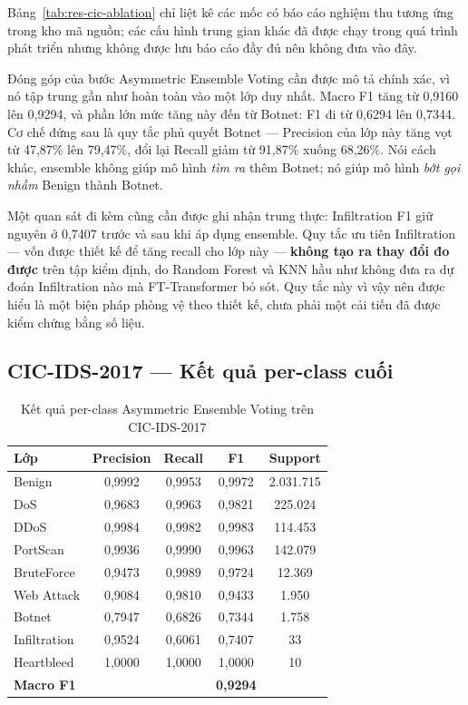 \documentclass[../DoAn.tex]{subfiles}
\begin{document}
Bảng~\ref{tab:res-cic-ablation} chỉ liệt kê các mốc có báo cáo nghiệm thu tương ứng trong kho mã nguồn; các cấu hình trung gian khác đã được chạy trong quá trình phát triển nhưng không được lưu báo cáo đầy đủ nên không đưa vào đây.

Đóng góp của bước Asymmetric Ensemble Voting cần được mô tả chính xác, vì nó tập trung gần như hoàn toàn vào một lớp duy nhất. Macro F1 tăng từ 0,9160 lên 0,9294, và phần lớn mức tăng này đến từ Botnet: F1 đi từ 0,6294 lên 0,7344. Cơ chế đứng sau là quy tắc phủ quyết Botnet --- Precision của lớp này tăng vọt từ 47,87\% lên 79,47\%, đổi lại Recall giảm từ 91,87\% xuống 68,26\%. Nói cách khác, ensemble không giúp mô hình \textit{tìm ra} thêm Botnet; nó giúp mô hình \textit{bớt gọi nhầm} Benign thành Botnet.

Một quan sát đi kèm cũng cần được ghi nhận trung thực: Infiltration F1 giữ nguyên ở 0,7407 trước và sau khi áp dụng ensemble. Quy tắc ưu tiên Infiltration --- vốn được thiết kế để tăng recall cho lớp này --- \textbf{không tạo ra thay đổi đo được} trên tập kiểm định, do Random Forest và KNN hầu như không đưa ra dự đoán Infiltration nào mà FT-Transformer bỏ sót. Quy tắc này vì vậy nên được hiểu là một biện pháp phòng vệ theo thiết kế, chưa phải một cải tiến đã được kiểm chứng bằng số liệu.

\subsection{CIC-IDS-2017 --- Kết quả per-class cuối}

\begin{table}[H]
    \centering
    \caption{Kết quả per-class Asymmetric Ensemble Voting trên CIC-IDS-2017}
    \label{tab:res-cic-final}
    \begin{tabular}{lcccc}
        \hline
        \textbf{Lớp} & \textbf{Precision} & \textbf{Recall} & \textbf{F1} & \textbf{Support} \\
        \hline
        Benign      & 0,9992 & 0,9953 & 0,9972 & 2.031.715 \\
        DoS         & 0,9683 & 0,9963 & 0,9821 & 225.024 \\
        DDoS        & 0,9984 & 0,9982 & 0,9983 & 114.453 \\
        PortScan    & 0,9936 & 0,9990 & 0,9963 & 142.079 \\
        BruteForce  & 0,9473 & 0,9989 & 0,9724 & 12.369 \\
        Web Attack  & 0,9084 & 0,9810 & 0,9433 & 1.950 \\
        Botnet      & 0,7947 & 0,6826 & 0,7344 & 1.758 \\
        Infiltration & 0,9524 & 0,6061 & 0,7407 & 33 \\
        Heartbleed  & 1,0000 & 1,0000 & 1,0000 & 10 \\
        \hline
        \textbf{Macro F1} & & & \textbf{0,9294} & \\
        \hline
    \end{tabular}
\end{table}
\end{document}
